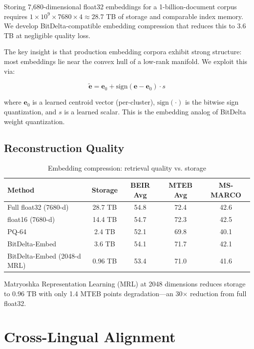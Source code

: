 \documentclass[11pt,a4paper]{article}
\begin{document}
Storing 7,680-dimensional float32 embeddings for a 1-billion-document corpus requires $1 \times 10^9 \times 7680 \times 4 \approx 28.7$ TB of storage and comparable index memory. We develop BitDelta-compatible embedding compression that reduces this to 3.6 TB at negligible quality loss.

The key insight is that production embedding corpora exhibit strong structure: most embeddings lie near the convex hull of a low-rank manifold. We exploit this via:

\begin{equation}
\tilde{\mathbf{e}} = \mathbf{e}_0 + \text{sign}(\mathbf{e} - \mathbf{e}_0) \cdot s
\end{equation}

where $\mathbf{e}_0$ is a learned centroid vector (per-cluster), $\text{sign}(\cdot)$ is the bitwise sign quantization, and $s$ is a learned scalar. This is the embedding analog of BitDelta weight quantization.

\subsection{Reconstruction Quality}

\begin{table}[H]
\centering
\caption{Embedding compression: retrieval quality vs. storage}
\label{tab:compression}
\begin{tabular}{lcccc}
\toprule
Method & Storage & BEIR Avg & MTEB Avg & MS-MARCO \\
\midrule
Full float32 (7680-d) & 28.7 TB & 54.8 & 72.4 & 42.6 \\
float16 (7680-d) & 14.4 TB & 54.7 & 72.3 & 42.5 \\
PQ-64 & 2.4 TB & 52.1 & 69.8 & 40.1 \\
BitDelta-Embed & 3.6 TB & 54.1 & 71.7 & 42.1 \\
BitDelta-Embed (2048-d MRL) & 0.96 TB & 53.4 & 71.0 & 41.6 \\
\bottomrule
\end{tabular}
\end{table}

Matryoshka Representation Learning (MRL) at 2048 dimensions reduces storage to 0.96 TB with only 1.4 MTEB points degradation—an 30$\times$ reduction from full float32.

\section{Cross-Lingual Alignment}
\end{document}
